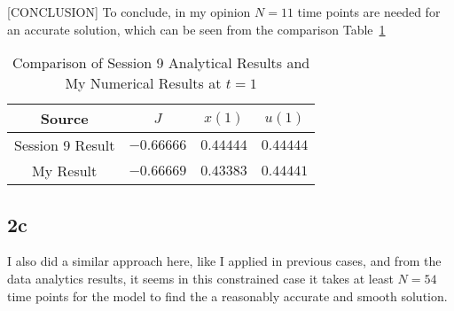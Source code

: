 \documentclass{article}
\begin{document}
[CONCLUSION] To conclude, in my opinion  $N = 11$ time points are needed for an accurate solution, which can be seen from the comparison Table~\ref{tab:comparison} 



\begin{table}[h!]
\centering
\begin{tabular}{|c|c|c|c|}
\hline
\textbf{Source} & $J$ & $x(1)$ & $u(1)$ \\
\hline
Session 9 Result & $-0.66666$ & $0.44444$ & $ 0.44444$ \\
\hline
My Result & $-0.66669$ & $0.43383$ & $0.44441$ \\
\hline
\end{tabular}
\caption{Comparison of Session 9 Analytical Results and My Numerical Results at $t = 1$}
\label{tab:comparison}

\end{table}

\subsection*{2c}
I also did a similar approach here, like I applied in previous cases, and from the data analytics results, it seems in this constrained case it takes at least \( N = 54 \) time points for the model to find the a reasonably accurate and smooth solution.
\end{document}
